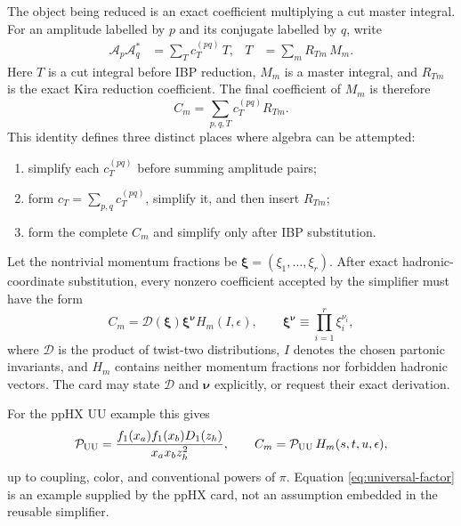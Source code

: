 \documentclass[11pt]{article}
\newcommand{\eps}{\epsilon}
\begin{document}
The object being reduced is an exact coefficient multiplying a cut master
integral.  For an amplitude labelled by $p$ and its conjugate labelled by $q$,
write
\begin{align}
  \mathcal A_p\mathcal A_q^{*}
  &=\sum_{T} c_{T}^{(pq)}\,T,
  &
  T&=\sum_m R_{Tm}\,M_m .
\end{align}
Here $T$ is a cut integral before IBP reduction, $M_m$ is a master integral,
and $R_{Tm}$ is the exact Kira reduction coefficient.  The final coefficient
of $M_m$ is therefore
\begin{equation}
  C_m=\sum_{p,q,T}c_T^{(pq)}R_{Tm}.
  \label{eq:master-coeff}
\end{equation}
This identity defines three distinct places where algebra can be attempted:
\begin{enumerate}
  \item simplify each $c_T^{(pq)}$ before summing amplitude pairs;
  \item form $c_T=\sum_{p,q}c_T^{(pq)}$, simplify it, and then insert
        $R_{Tm}$;
  \item form the complete $C_m$ and simplify only after IBP substitution.
\end{enumerate}

Let the nontrivial momentum fractions be
$\boldsymbol{\xi}=(\xi_1,\ldots,\xi_r)$.  After exact hadronic-coordinate
substitution, every nonzero coefficient accepted by the simplifier must have
the form
\begin{equation}
  C_m=\mathcal D(\boldsymbol{\xi})
  \boldsymbol{\xi}^{\boldsymbol{\nu}} H_m(I,\eps),
  \qquad
  \boldsymbol{\xi}^{\boldsymbol{\nu}}
  \equiv\prod_{i=1}^{r}\xi_i^{\nu_i},
  \label{eq:generic-hard-factor}
\end{equation}
where $\mathcal D$ is the product of twist-two distributions, $I$ denotes
the chosen partonic invariants, and $H_m$ contains neither momentum fractions
nor forbidden hadronic vectors.  The card may state $\mathcal D$ and
$\boldsymbol{\nu}$ explicitly, or request their exact derivation.

For the ppHX UU example this gives
\begin{equation}
  \mathcal P_{\rm UU}=
  \frac{f_1(x_a)f_1(x_b)D_1(z_h)}{x_a x_b z_h^2},
  \qquad
  C_m=\mathcal P_{\rm UU}\,H_m(s,t,u,\eps),
  \label{eq:universal-factor}
\end{equation}
up to coupling, color, and conventional powers of $\pi$.  Equation
\eqref{eq:universal-factor} is an example supplied by the ppHX card, not an
assumption embedded in the reusable simplifier.
\end{document}
